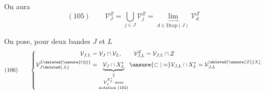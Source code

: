 
On aura
\[(105)\qquad\mathcal V_J^Z=\bigcup_{j\in J}\mathcal V_j^Z=\underset{d\in\mathrm{Drap}(J)}{\lim_{\longrightarrow}}\mathcal V_d^Z\]

On pose, pour deux bandes $J$ et $L$
\[
(106)\qquad\left\{\begin{aligned}
\mathcal V_{J,L}&=\mathcal V_J\cap\mathcal V_L,\qquad\mathcal V_{J,L}^Z=\mathcal V_{J,L}\cap Z\\
\mathcal V_{J\deleted{,L}}^{L\deleted{\unsure{\flat|\natural}}}&=\underbrace{\mathcal V_J\cap X_L^*}_{\substack{\Vert\\\mathcal V_J^{X_L^*}\text{ avec}\\\text{notation }(102)}}\unsure{\subset|=}\mathcal V_{J,L}\cap X_L^*=\mathcal V_{J,L}^{\deleted{\unsure{Z}}X_L^*}
\end{aligned}\right.
\]

